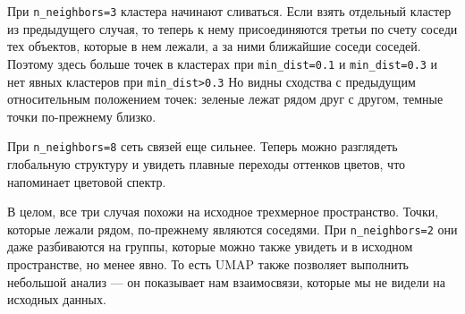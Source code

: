 При \verb|n_neighbors=3| кластера начинают сливаться.  Если взять отдельный кластер из предыдущего случая, то теперь к нему присоединяются третьи по счету соседи тех объектов, которые в нем лежали, а за ними ближайшие соседи соседей. Поэтому здесь больше точек в кластерах при \verb|min_dist=0.1| и \verb|min_dist=0.3| и нет явных кластеров при \verb|min_dist>0.3| Но видны сходства с предыдущим относительным положением точек: зеленые лежат рядом друг с другом, темные точки по-прежнему близко.

При \verb|n_neighbors=8| сеть связей еще сильнее. Теперь можно разглядеть глобальную структуру и увидеть плавные переходы оттенков цветов, что напоминает цветовой спектр.

В целом, все три случая похожи на исходное трехмерное пространство. Точки, которые лежали рядом, по-прежнему являются соседями. При \verb|n_neighbors=2| они даже разбиваются на группы, которые можно также увидеть и в исходном пространстве, но менее явно. То есть UMAP также позволяет выполнить небольшой анализ --- он показывает нам взаимосвязи, которые мы не видели на исходных данных.
